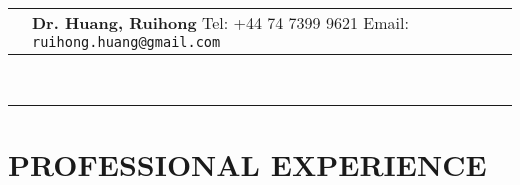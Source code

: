 \documentclass[a4paper,10pt]{article}
\begin{document}
\newcommand{\HU}[0]{Humboldt Universit\"at zu Berlin}
\titleformat{\section}{\normalfont\large\bfseries}{\thesection}{1em}{}
\newenvironment{idesc}{\begin{description}[font=\hspace{1em}\ding{249}~\scshape\bfseries]}{\end{description}}

\renewcommand\labelitemi{\ding{249}}
\fancyhf{}
\renewcommand{\headrulewidth}{0pt}
\renewcommand{\footrulewidth}{0pt}
\renewcommand\footrule{\begin{minipage}{1\textwidth}
        \vspace{1em}
\hrule width \hsize height 2pt \kern 1mm \hrule width \hsize   
\end{minipage}\par}
\pagestyle{fancy}
\lfoot{\monthyear\today}
\begin{tabular}[h]{p{}p{}}
    &\vspace{1pt}\large{\textbf{Dr. Huang, Ruihong}\newline
  \vspace{-8pt} \newline
Tel: +44 74 7399 9621  \newline
Email: \verb|ruihong.huang@gmail.com| } \\
\end{tabular}\\
\rule[5pt]{1\textwidth}{1pt}\par
\setlength{\tabcolsep}{10pt}
\setlength{\extrarowheight}{7pt}
\section{PROFESSIONAL EXPERIENCE}
\end{document}
